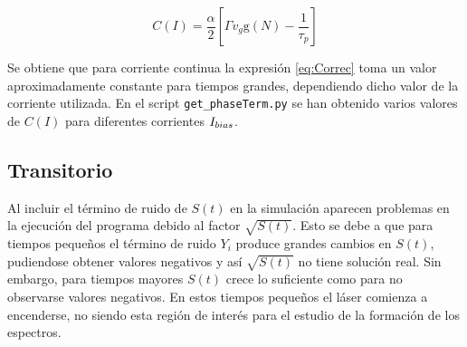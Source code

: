 			\begin{equation}
				C (I) = \frac{\alpha}{2} \left[ \Gamma v_g \textrm{g}(N) - \frac{1}{\tau_p} \right]
				\label{eq:Correc}
			\end{equation}

		Se obtiene que para corriente continua la expresi\'on \ref{eq:Correc} toma un valor aproximadamente constante para tiempos grandes, dependiendo dicho valor de la corriente utilizada. En el script \texttt{get\_phaseTerm.py} se han obtenido varios valores de $C(I)$ para diferentes corrientes $I_{bias}$.




		
	\subsection{Transitorio}
		\label{Mdl:Code:Trans}

		Al incluir el t\'ermino de ruido de $S(t)$ en la simulaci\'on aparecen problemas en la ejecución del programa debido al factor $\sqrt{S(t)}$. Esto se debe a que para tiempos pequeños el término de ruido $Y_i$ produce grandes cambios en $S(t)$, pudiendose obtener valores negativos y así $\sqrt{S(t)}$ no tiene solución real. Sin embargo, para tiempos mayores $S(t)$ crece lo suficiente como para no observarse valores negativos. En estos tiempos pequeños el láser comienza a encenderse, no siendo esta región de interés para el estudio de la formación de los espectros.

